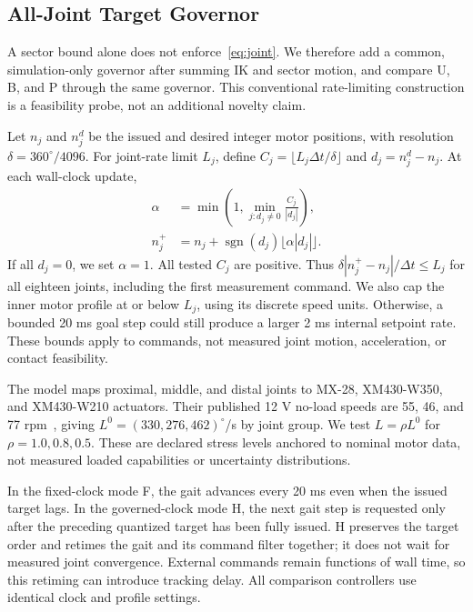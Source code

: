 \subsection{All-Joint Target Governor}
A sector bound alone does not enforce~\eqref{eq:joint}. We therefore add a common, simulation-only governor after summing IK and sector motion, and compare U, B, and P through the same governor. This conventional rate-limiting construction is a feasibility probe, not an additional novelty claim.

Let $n_j$ and $n_j^d$ be the issued and desired integer motor positions, with resolution $\delta=360^\circ/4096$. For joint-rate limit $L_j$, define $C_j=\lfloor L_j\Delta t/\delta\rfloor$ and $d_j=n_j^d-n_j$. At each wall-clock update,
\begin{align}
 \alpha&=\min\!\left(1,\min_{j:d_j\ne0}\frac{C_j}{|d_j|}\right),\\
 n_j^+&=n_j+\operatorname{sgn}(d_j)\lfloor\alpha|d_j|\rfloor.\label{eq:governor}
\end{align}
If all $d_j=0$, we set $\alpha=1$. All tested $C_j$ are positive. Thus $\delta|n_j^+-n_j|/\Delta t\le L_j$ for all eighteen joints, including the first measurement command. We also cap the inner motor profile at or below $L_j$, using its discrete speed units. Otherwise, a bounded 20 ms goal step could still produce a larger 2 ms internal setpoint rate. These bounds apply to commands, not measured joint motion, acceleration, or contact feasibility.

The model maps proximal, middle, and distal joints to MX-28, XM430-W350, and XM430-W210 actuators. Their published 12 V no-load speeds are 55, 46, and 77 rpm~\cite{robotisMX,robotisW350,robotisW210}, giving $L^0=(330,276,462)^\circ$/s by joint group. We test $L=\rho L^0$ for $\rho=1.0,0.8,0.5$. These are declared stress levels anchored to nominal motor data, not measured loaded capabilities or uncertainty distributions.

In the fixed-clock mode F, the gait advances every 20 ms even when the issued target lags. In the governed-clock mode H, the next gait step is requested only after the preceding quantized target has been fully issued. H preserves the target order and retimes the gait and its command filter together; it does not wait for measured joint convergence. External commands remain functions of wall time, so this retiming can introduce tracking delay. All comparison controllers use identical clock and profile settings.
